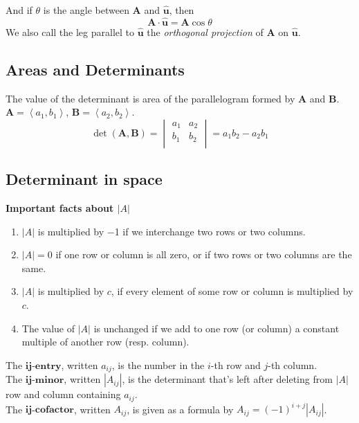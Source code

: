 \documentclass{article}
\newcommand\printvec[1]{\mathbf{#1}}
\newcommand\lrangle[1]{\left \langle #1 \right \rangle}
\newcommand\directv{\hat{\mathbf{u}}}
\newcommand\deter[1]{\left| #1 \right|}
\begin{document}
And if $\theta$ is the angle between $\printvec{A}$ and $\directv$, then
$$\printvec{A} \cdot \directv = \printvec{A}\cos\theta$$
We also call the leg parallel to $\directv$ the \textit{orthogonal projection} of $\mathbf{A}$ on $\directv$.

\subsection{Areas and Determinants}

The value of the determinant is area of the parallelogram formed by $\mathbf{A}$ and $\mathbf{B}$.
$\mathbf{A} = \lrangle{a_1, b_1}$, $\mathbf{B} = \lrangle{a_2, b_2}$.
\begin{equation*}
  \det(\mathbf{A}, \mathbf{B})
  = \begin{vmatrix}
    a_1 & a_2 \\
    b_1 & b_2 \\
  \end{vmatrix}
  = a_1b_2 - a_2b_1
\end{equation*}


\subsection{Determinant in space}

\textbf{Important facts about $\deter{A}$}
\begin{enumerate}
  \item $\deter{A}$ is multiplied by −1 if we interchange two rows or two columns.
  \item $\deter{A} = 0$ if one row or column is all zero, or if two rows or two columns are the same.
  \item $\deter{A}$ is multiplied by $c$, if every element of some row or column is multiplied by $c$.
  \item The value of $\deter{A}$ is unchanged if we add to one row (or column) a constant multiple of another row (resp. column).
\end{enumerate}

The $\mathbf{ij}$-$\textbf{entry}$, written $a_{ij}$, is the number in the $i$-th row and $j$-th column. \\
The $\mathbf{ij}$-$\textbf{minor}$, written $\left| A_{ij} \right|$, is the determinant that’s left after deleting from $\deter{A}$ row
and column containing $a_{ij}$. \\
The $\mathbf{ij}$-$\textbf{cofactor}$, written $A_{ij}$, is given as a formula by $A_{ij} = (−1)^{i+j}\left| A_{ij} \right|$.
\end{document}

